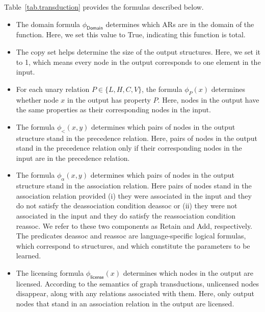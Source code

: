 Table~\ref{tab.transduction} provides the formulas described below.
\begin{itemize}\itemsep-0.5ex
	\item The domain formula $\phi_{\textsf{Domain}}$ determines which ARs
	are in the domain of the function. Here, we set this value to True,
	indicating this function is total.
	\item The copy set helps determine the size of the output structures.
	Here, we set it to 1, which means every node in the output
	corresponds to one element in the input.
	\item For each unary relation $P\in\{L, H, C, V\}$, the formula
	\(\phi_{P}(x)\) determines whether node \(x\) in the output has
	property \(P\). Here, nodes in the output have the same properties
	as their corresponding nodes in the input.
	\item The formula  \(\phi_{<}(x,y)\) determines which pairs of nodes
	in the output structure stand in the precedence relation. Here,
	pairs of nodes in the output stand in the precedence relation only
	if their corresponding nodes in the input are in the precedence
	relation.
	\item The formula  \(\phi_{\alpha}(x,y)\) determines which pairs of
	nodes in the output structure stand in the association relation.
	Here pairs of nodes stand in the association relation provided (i)
	they were associated in the input and they do not satisfy the
	deassociation condition \textsf{deassoc} or (ii) they were not
	associated in the input and they do satisfy the reassociation
	condition \textsf{reassoc}. We refer to these two components as
	\textsf{Retain} and \textsf{Add}, respectively. The predicates
	\textsf{deassoc} and \textsf{reassoc} are language-specific logical
	formulas, which correspond to structures, and which constitute the
	parameters to be learned.
	
	
	\item The licensing formula $\phi_{\textsf{license}}(x)$ determines
	which nodes in the output are licensed. According to the semantics
	of graph transductions, unlicensed nodes disappear, along with any
	relations associated with them. Here, only output nodes that stand
	in an association relation in the output are licensed.
	
\end{itemize}


